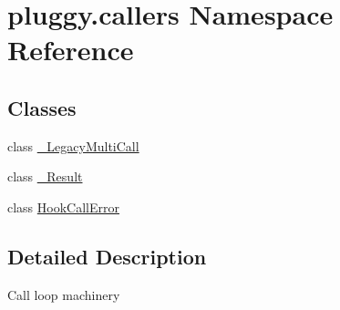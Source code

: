 \hypertarget{namespacepluggy_1_1callers}{}\section{pluggy.\+callers Namespace Reference}
\label{namespacepluggy_1_1callers}
\subsection*{Classes}
\begin{DoxyCompactItemize}
\item 
class \hyperlink{classpluggy_1_1callers_1_1___legacy_multi_call}{\+\_\+\+Legacy\+Multi\+Call}
\item 
class \hyperlink{classpluggy_1_1callers_1_1___result}{\+\_\+\+Result}
\item 
class \hyperlink{classpluggy_1_1callers_1_1_hook_call_error}{Hook\+Call\+Error}
\end{DoxyCompactItemize}


\subsection{Detailed Description}
\begin{DoxyVerb}Call loop machinery
\end{DoxyVerb}
 